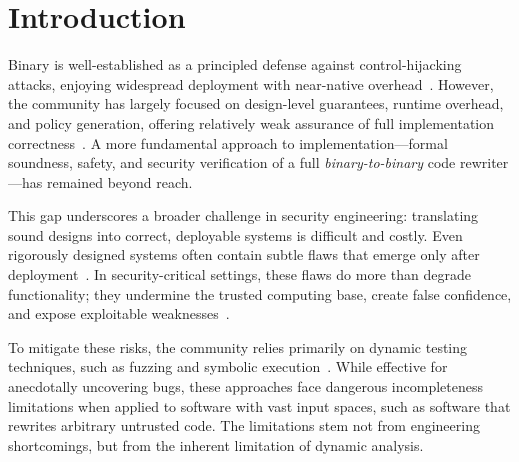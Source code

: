 \section{Introduction}
\label{sec:intro}

Binary \cfi is well-established as a principled defense against control-hijacking attacks, enjoying widespread deployment with near-native overhead~\cite{bincfi, ccfir, kbouncer, ropecker,cfi2005ccs}.
However, the community has largely focused on design-level guarantees, runtime overhead, and policy generation, offering relatively weak assurance of full implementation correctness~\cite{li2020ccs}. A more fundamental approach to \cfi implementation---formal soundness, safety, and security verification of a full \emph{binary-to-binary} \cfi code rewriter---has remained beyond reach.

This gap underscores a broader challenge in security engineering: translating sound designs into correct, deployable systems is difficult and costly. Even rigorously designed systems often contain subtle flaws that emerge only after deployment~\cite{heartbleed, shellshock}. In security-critical settings, these flaws do more than degrade functionality; they undermine the trusted computing base, create false confidence, and expose exploitable weaknesses~\cite{solarwinds}.

To mitigate these risks, the community relies primarily on dynamic testing techniques, such as fuzzing and symbolic execution~\cite{fuzzing,symbolic_execution, model_checking}. While effective for anecdotally uncovering bugs, these approaches face dangerous incompleteness limitations when applied to software with vast input spaces, such as software that rewrites arbitrary untrusted code. The limitations stem not from engineering shortcomings, but from the inherent limitation of dynamic analysis.



